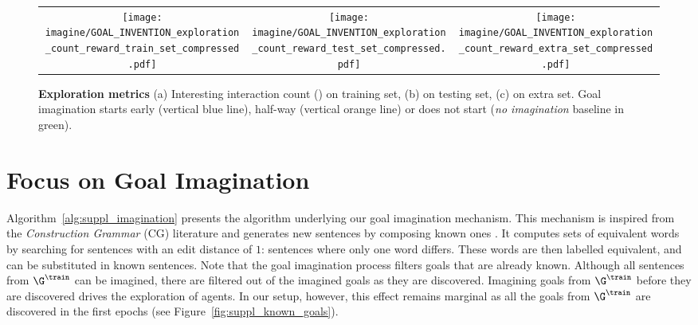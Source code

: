 \begin{figure*}[!h]
  \centering
  \begin{tabular}{ccc}
  	\texttt{[image: imagine/GOAL\_INVENTION\_exploration\_count\_reward\_train\_set\_compressed.pdf]} & \texttt{[image: imagine/GOAL\_INVENTION\_exploration\_count\_reward\_test\_set\_compressed.pdf]} &
  		  \texttt{[image: imagine/GOAL\_INVENTION\_exploration\_count\_reward\_extra\_set\_compressed.pdf]}
  \end{tabular}
  \caption{\textbf{Exploration metrics} (a) Interesting interaction count (\itwoc) on training set, (b) \itwoc on testing set, (c) \itwoc on extra set. Goal imagination starts early (vertical blue line), half-way (vertical orange line) or does not start (\textit{no imagination} baseline in green).}
  \label{fig:explo_metrics}
\end{figure*}   


\clearpage

\section{Focus on Goal Imagination}
\label{sec:suppl_goal_imagination}

Algorithm~\ref{alg:suppl_imagination} presents the algorithm underlying our goal imagination mechanism. This mechanism is inspired from the \textit{Construction Grammar} (CG) literature and generates new sentences by composing known ones \cite{goldberg2003constructions}. It computes sets of equivalent words by searching for sentences with an edit distance of $1$: sentences where only one word differs. These words are then labelled equivalent, and can be substituted in known sentences. Note that the goal imagination process filters goals that are already known. Although all sentences from $\G^\train$ can be imagined, there are filtered out of the imagined goals as they are discovered. Imagining goals from $\G^\train$ before they are discovered drives the exploration of \imagine agents. In our setup, however, this effect remains marginal as all the goals from $\G^\train$ are discovered in the first epochs (see Figure~\ref{fig:suppl_known_goals}). 





